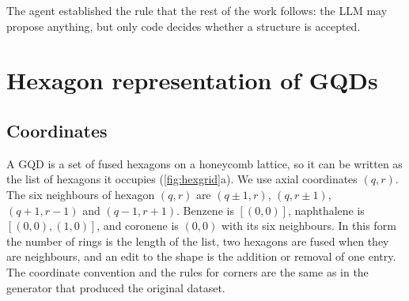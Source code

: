The agent established the rule that the rest of the work follows: the LLM may propose anything,
but only code decides whether a structure is accepted.

\section{Hexagon representation of GQDs}
\label{sec:hex}

\subsection{Coordinates}

A GQD is a set of fused hexagons on a honeycomb lattice, so it can be written as the list of
hexagons it occupies (\cref{fig:hexgrid}a). We use axial coordinates \((q,r)\). The six neighbours
of hexagon \((q,r)\) are \((q\pm1,r)\), \((q,r\pm1)\), \((q+1,r-1)\) and \((q-1,r+1)\). Benzene is
\([(0,0)]\), naphthalene is \([(0,0),(1,0)]\), and coronene is \((0,0)\) with its six neighbours.
In this form the number of rings is the length of the list, two hexagons are fused when they are
neighbours, and an edit to the shape is the addition or removal of one entry. The coordinate
convention and the rules for corners are the same as in the generator that produced the original
dataset.

